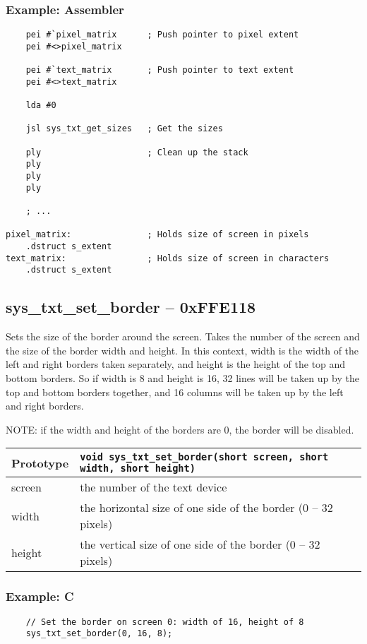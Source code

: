 \subsubsection*{Example: Assembler}
\begin{verbatim}
    pei #`pixel_matrix      ; Push pointer to pixel extent
    pei #<>pixel_matrix

    pei #`text_matrix       ; Push pointer to text extent
    pei #<>text_matrix

    lda #0

    jsl sys_txt_get_sizes   ; Get the sizes

    ply                     ; Clean up the stack
    ply
    ply
    ply

    ; ...

pixel_matrix:               ; Holds size of screen in pixels
    .dstruct s_extent
text_matrix:                ; Holds size of screen in characters
    .dstruct s_extent
\end{verbatim}


\subsection*{sys\_txt\_set\_border -- 0xFFE118}
Sets the size of the border around the screen. Takes the number of the screen and the size of the border width and height.
In this context, width is the width of the left and right borders taken separately, and height is the height of the top and bottom borders.
So if width is 8 and height is 16, 32 lines will be taken up by the top and bottom borders together,
and 16 columns will be taken up by the left and right borders.

NOTE: if the width and height of the borders are 0, the border will be disabled.

\bigskip

\begin{tabular}{|l||l|} \hline
Prototype & \lstinline!void sys_txt_set_border(short screen, short width, short height)! \\ \hline
screen & the number of the text device \\ \hline
width & the horizontal size of one side of the border (0 -- 32 pixels) \\ \hline
height & the vertical size of one side of the border (0 -- 32 pixels) \\ \hline
\end{tabular}

\subsubsection*{Example: C}
\begin{lstlisting}
    // Set the border on screen 0: width of 16, height of 8
    sys_txt_set_border(0, 16, 8);
\end{lstlisting}

